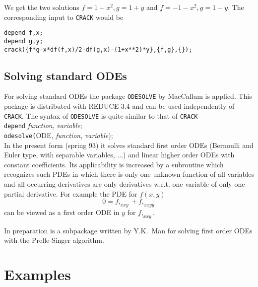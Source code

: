 We get the two solutions $f = 1 + x^2, g = 1 + y$ and
$f = - 1 - x^2, g = 1 - y.$ The corresponding input to {\tt CRACK} would be
\begin{verbatim}
depend f,x;
depend g,y;
crack({f*g-x*df(f,x)/2-df(g,x)-(1+x**2)*y},{f,g},{});
\end{verbatim}

\subsection{Solving standard ODEs}
For solving standard ODEs the package {\tt ODESOLVE} by MacCallum
\cite{Mal} is applied. This package is distributed with REDUCE 3.4
and can be used independently of {\tt CRACK}. The syntax of
{\tt ODESOLVE} is quite similar to that of {\tt CRACK} \\
\verb+depend+ {\it function}, {\it variable}; \\
\verb+odesolve(+ODE, {\it function}, {\it variable});  \\
In the present form (spring 93) it solves standard first order ODEs
(Bernoulli and Euler type, with separable variables, $\ldots$) and linear
higher order ODEs with constant coefficients. Its applicability is
increased by a subroutine which recognizes such PDEs in which there is only
one unknown function of all variables and all occurring derivatives
are only derivatives w.r.t. one variable of only one partial derivative.
For example the PDE for $f(x,y)$
\[ 0 = f,_{xxy} + f,_{xxyy} \]
can be viewed as a first order ODE in $y$ for $f,_{xxy}.$

In preparation is a subpackage
written by Y.K.\ Man for solving first order ODEs with the Prelle-Singer
algorithm.

\section{Examples}

